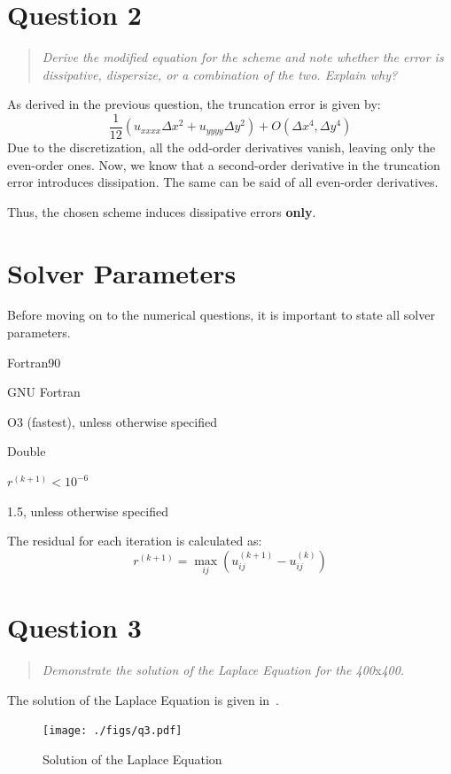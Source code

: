 \documentclass{SelimArticle}
\begin{document}
\section{Question 2}
\begin{quote}
    \textit{Derive the modified equation for the scheme and note whether the error is dissipative,
    dispersize, or a combination of the two. Explain why?}
\end{quote}
As derived in the previous question, the truncation error is given by:
$$
    \frac{1}{12}\left(u_{xxxx}\Delta x ^2 + u_{yyyy}\Delta y^2 \right)
    + O(\Delta x^4, \Delta y^4)
$$
Due to the discretization, all the odd-order derivatives vanish, leaving only the even-order ones.
Now, we know that a second-order derivative in the truncation error introduces dissipation.
The same can be said of all even-order derivatives.

Thus, the chosen scheme induces dissipative errors \textbf{only}.

\section{Solver Parameters}
Before moving on to the numerical questions, it is important to state all solver parameters.
\begin{description}[noitemsep]
    \item[Programming Language:] Fortran90
    \item[Compiler:] GNU Fortran
    \item[Optimization Level:] O3 (fastest), unless otherwise specified
    \item[Precision:] Double
    \item[Convergence Criteria:] $r^{(k+1)} < 10^{-6}$
    \item[Relaxation Parameter:] 1.5, unless otherwise specified
\end{description}

The residual for each iteration is calculated as:
$$
r^{(k+1)} = \max_{ij}\left( u^{(k+1)}_{ij} - u^{(k)}_{ij} \right)
$$
\newpage
\section{Question 3}
\begin{quote}
    \textit{Demonstrate the solution of the Laplace Equation for the 400}x\textit{400.}
\end{quote}
The solution of the Laplace Equation is given in~.
\begin{figure}[H]
    \centering
    \texttt{[image: ./figs/q3.pdf]}
    \caption{Solution of the Laplace Equation}\label{fig:q3}
\end{figure}
\end{document}
